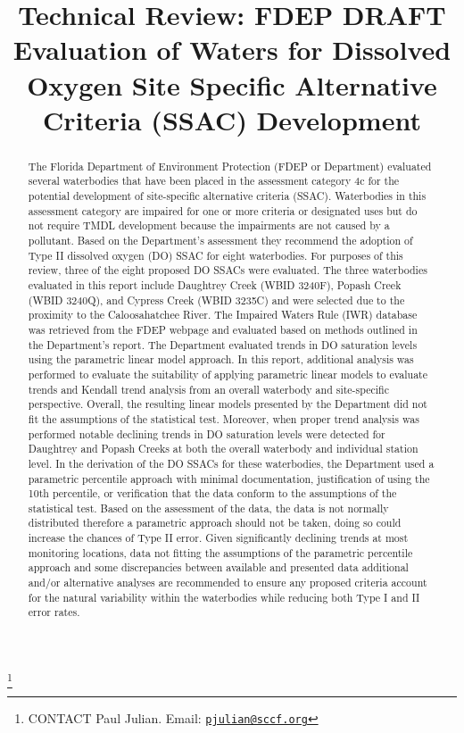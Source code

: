 \documentclass[]{interact}
\theoremstyle{plain}%
\theoremstyle{definition}
\theoremstyle{remark}
\begin{document}

\title{\textsf{Technical Review:} FDEP DRAFT Evaluation of Waters for
Dissolved Oxygen Site Specific Alternative Criteria (SSAC) Development}


\author{
}

\thanks{CONTACT Paul
Julian. Email: \href{mailto:pjulian@sccf.org}{\nolinkurl{pjulian@sccf.org}}}

\maketitle

\begin{abstract}
The Florida Department of Environment Protection (FDEP or Department)
evaluated several waterbodies that have been placed in the assessment
category 4c for the potential development of site-specific alternative
criteria (SSAC). Waterbodies in this assessment category are impaired
for one or more criteria or designated uses but do not require TMDL
development because the impairments are not caused by a pollutant. Based
on the Department's assessment they recommend the adoption of Type II
dissolved oxygen (DO) SSAC for eight waterbodies. For purposes of this
review, three of the eight proposed DO SSACs were evaluated. The three
waterbodies evaluated in this report include Daughtrey Creek (WBID
3240F), Popash Creek (WBID 3240Q), and Cypress Creek (WBID 3235C) and
were selected due to the proximity to the Caloosahatchee River. The
Impaired Waters Rule (IWR) database was retrieved from the FDEP webpage
and evaluated based on methods outlined in the Department's report. The
Department evaluated trends in DO saturation levels using the parametric
linear model approach. In this report, additional analysis was performed
to evaluate the suitability of applying parametric linear models to
evaluate trends and Kendall trend analysis from an overall waterbody and
site-specific perspective. Overall, the resulting linear models
presented by the Department did not fit the assumptions of the
statistical test. Moreover, when proper trend analysis was performed
notable declining trends in DO saturation levels were detected for
Daughtrey and Popash Creeks at both the overall waterbody and individual
station level. In the derivation of the DO SSACs for these waterbodies,
the Department used a parametric percentile approach with minimal
documentation, justification of using the 10th percentile, or
verification that the data conform to the assumptions of the statistical
test. Based on the assessment of the data, the data is not normally
distributed therefore a parametric approach should not be taken, doing
so could increase the chances of Type II error. Given significantly
declining trends at most monitoring locations, data not fitting the
assumptions of the parametric percentile approach and some discrepancies
between available and presented data additional and/or alternative
analyses are recommended to ensure any proposed criteria account for the
natural variability within the waterbodies while reducing both Type I
and II error rates.
\end{abstract}
\end{document}
